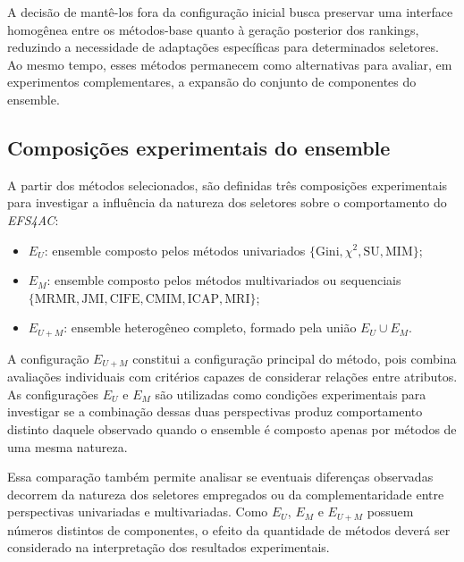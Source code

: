 A decisão de mantê-los fora da configuração inicial busca preservar uma
interface homogênea entre os métodos-base quanto à geração posterior dos
rankings, reduzindo a necessidade de adaptações específicas para determinados
seletores. Ao mesmo tempo, esses métodos permanecem como alternativas para
avaliar, em experimentos complementares, a expansão do conjunto de componentes
do ensemble.


\subsection{Composições experimentais do ensemble}
\label{subsec:ac-efs-composicoes-ensemble}

A partir dos métodos selecionados, são definidas três composições experimentais
para investigar a influência da natureza dos seletores sobre o comportamento
do \textit{EFS4AC}:

\begin{itemize}

    \item $E_U$: ensemble composto pelos métodos univariados
    $\{\text{Gini}, \chi^2, \text{SU}, \text{MIM}\}$;

    \item $E_M$: ensemble composto pelos métodos multivariados ou sequenciais
    $\{\text{MRMR}, \text{JMI}, \text{CIFE}, \text{CMIM},
    \text{ICAP}, \text{MRI}\}$;

    \item $E_{U+M}$: ensemble heterogêneo completo, formado pela união
    $E_U \cup E_M$.

\end{itemize}

A configuração $E_{U+M}$ constitui a configuração principal do método, pois
combina avaliações individuais com critérios capazes de considerar relações
entre atributos. As configurações $E_U$ e $E_M$ são utilizadas como condições
experimentais para investigar se a combinação dessas duas perspectivas produz
comportamento distinto daquele observado quando o ensemble é composto apenas
por métodos de uma mesma natureza.

Essa comparação também permite analisar se eventuais diferenças observadas
decorrem da natureza dos seletores empregados ou da complementaridade entre
perspectivas univariadas e multivariadas. Como $E_U$, $E_M$ e $E_{U+M}$
possuem números distintos de componentes, o efeito da quantidade de métodos
deverá ser considerado na interpretação dos resultados experimentais.

